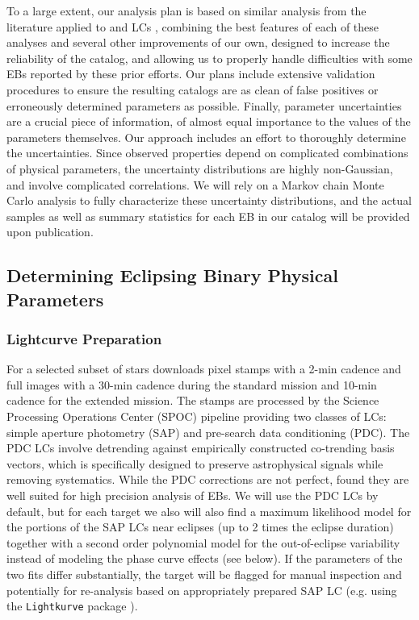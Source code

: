 %
\label{sec:technical_approach}

To a large extent, our analysis plan is based on similar analysis from the
literature applied to \kepler{} and \tess{} LCs \citep{Reinhold_et_al_13,
Lurie_et_al_17, Windemuth_et_al_19, CantoMartins_et_al_20,
Justesen_Albrecht_21}, combining the best features of each of these analyses and
several other improvements of our own, designed to increase the reliability of
the catalog, and allowing us to properly handle difficulties with some EBs
reported by these prior efforts. Our plans include extensive validation
procedures to ensure the resulting catalogs are as clean of false positives or
erroneously determined parameters as possible. Finally, parameter uncertainties
are a crucial piece of information, of almost equal importance to the values of
the parameters themselves. Our approach includes an effort to thoroughly
determine the uncertainties. Since observed properties depend on complicated
combinations of physical parameters, the uncertainty distributions are highly
non-Gaussian, and involve complicated correlations. We will rely on a Markov
chain Monte Carlo analysis to fully characterize these uncertainty
distributions, and the actual samples as well as summary statistics for each EB
in our catalog will be provided upon publication.

\subsection{Determining Eclipsing Binary Physical Parameters}
%
\label{sec:eb_parameters_technical}

\subsubsection{Lightcurve Preparation}
%
\label{sec:params_lc_preparation}

For a selected subset of stars \tess{} downloads pixel stamps with a 2-min
cadence and full images with a 30-min cadence during the standard mission and
10-min cadence for the extended mission. The stamps are processed by the Science
Processing Operations Center (SPOC) pipeline \citep{Jenkins_et_al_16} providing
two classes of LCs: simple aperture photometry (SAP) and pre-search data
conditioning (PDC). The PDC LCs involve detrending against empirically
constructed co-trending basis vectors, which is specifically designed to
preserve astrophysical signals while removing systematics. While the PDC
corrections are not perfect, \citep{Justesen_Albrecht_21} found they are well
suited for high precision analysis of EBs. We will use the PDC LCs by default,
but for each target we also will also find a maximum likelihood model for the
portions of the SAP LCs near eclipses (up to 2 times the eclipse duration)
together with a second order polynomial model for the out-of-eclipse variability
instead of modeling the phase curve effects (see below). If the parameters of
the two fits differ substantially, the target will be flagged for manual
inspection and potentially for re-analysis based on appropriately prepared SAP
LC (e.g. using the \texttt{Lightkurve} package \citep{Lightkurve_18}).

